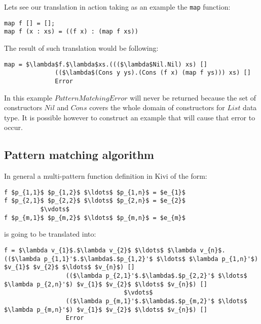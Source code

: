 \documentclass[12pt,a4paper]{report}
\begin{document}
Lets see our translation in action taking as an example the \texttt{map}
function:

\hspace*{-1.5in}
\begin{lstlisting}[style=haskell]
map f [] = [];
map f (x : xs) = ((f x) : (map f xs))
\end{lstlisting}
The result of such translation would be following:

\hspace*{-1.5in}
\begin{lstlisting}[style=haskell,mathescape=true]
map = $\lambda$f.$\lambda$xs.((($\lambda$Nil.Nil) xs) []
              (($\lambda$(Cons y ys).(Cons (f x) (map f ys))) xs) []
              Error
\end{lstlisting}
In this example $PatternMatchingError$ will never be returned because the set
of constructors $Nil$ and $Cons$ covers the whole domain of constructors for
$List$ data type. It is possible however to construct an example that will cause
that error to occur.

\subsection{Pattern matching algorithm}
\label{sec:pattern_matching_algorithm}

In general a multi-pattern function definition in Kivi of the form:

\hspace*{-1.5in}
\begin{lstlisting}[style=haskell,mathescape=true]
f $p_{1,1}$ $p_{1,2}$ $\ldots$ $p_{1,n}$ = $e_{1}$
f $p_{2,1}$ $p_{2,2}$ $\ldots$ $p_{2,n}$ = $e_{2}$
          $\vdots$
f $p_{m,1}$ $p_{m,2}$ $\ldots$ $p_{m,n}$ = $e_{m}$
\end{lstlisting}
is going to be translated into:

\hspace*{-1.5in}
\begin{lstlisting}[style=haskell,mathescape=true]
f = $\lambda v_{1}$.$\lambda v_{2}$ $\ldots$ $\lambda v_{n}$.(($\lambda p_{1,1}'$.$\lambda$.$p_{1,2}'$ $\ldots$ $\lambda p_{1,n}'$) $v_{1}$ $v_{2}$ $\ldots$ $v_{n}$) []
                 (($\lambda p_{2,1}'$.$\lambda$.$p_{2,2}'$ $\ldots$ $\lambda p_{2,n}'$) $v_{1}$ $v_{2}$ $\ldots$ $v_{n}$) []
                                 $\vdots$
                 (($\lambda p_{m,1}'$.$\lambda$.$p_{m,2}'$ $\ldots$ $\lambda p_{m,n}'$) $v_{1}$ $v_{2}$ $\ldots$ $v_{n}$) []
                 Error
\end{lstlisting}
\end{document}
